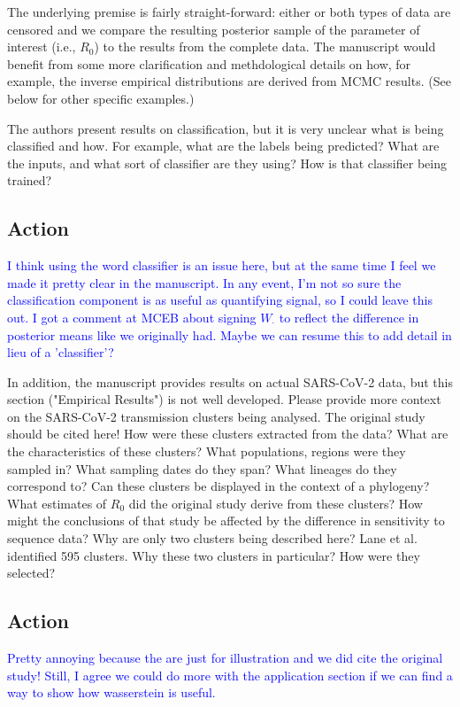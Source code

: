\documentclass{article}
\begin{document}
The underlying premise is fairly straight-forward: either or both types of data are censored and we compare the resulting posterior sample of the parameter of interest (i.e., $R_{0}$) to the results from the complete data.  The manuscript would benefit from some more clarification and methdological details on how, for example, the inverse empirical distributions are derived from MCMC results.  (See below for other specific examples.)  


The authors present results on classification, but it is very unclear what is being classified and how.  For example, what are the labels being predicted?  What are the inputs, and what sort of classifier are they using?  How is that classifier being trained?

\subsection*{Action}
\textcolor{blue}{I think using the word classifier is an issue here, but at the same time I feel we made it pretty clear in the manuscript. In any event, I'm not so sure the classification component is as useful as quantifying signal, so I could leave this out. I got a comment at MCEB about signing $W_{\cdot}$ to reflect the difference in posterior means like we originally had. Maybe we can resume this to add detail in lieu of a 'classifier'?}

In addition, the manuscript provides results on actual SARS-CoV-2 data, but this section ("Empirical Results") is not well developed.  Please provide more context on the SARS-CoV-2 transmission clusters being analysed.  The original study should be cited here! How were these clusters extracted from the data?  What are the characteristics of these clusters?  What populations, regions were they sampled in?  What sampling dates do they span?  What lineages do they correspond to?  Can these clusters be displayed in the context of a phylogeny?  What estimates of $R_{0}$ did the original study derive from these clusters?  How might the conclusions of that study be affected by the difference in sensitivity to sequence data?  Why are only two clusters being described here?  Lane et al. identified 595 clusters.  Why these two clusters in particular?  How were they selected?

\subsection*{Action}
\textcolor{blue}{Pretty annoying because the are just for illustration and we did cite the original study! Still, I agree we could do more with the application section if we can find a way to show how wasserstein is useful.}
\end{document}
